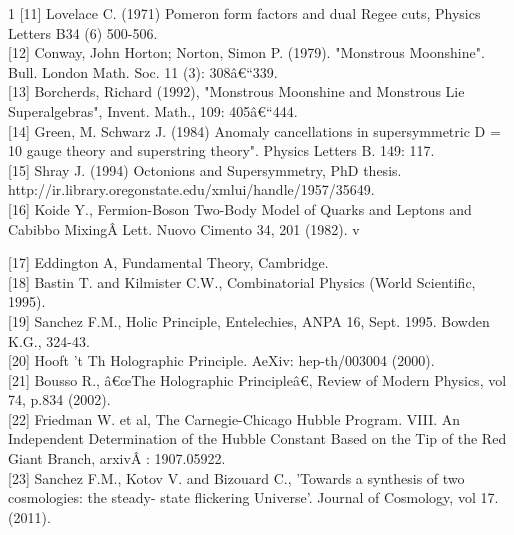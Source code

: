 \documentclass[a4paper,9pt]{article}
\begin{document}
\begin{thebibliography}{1}
 [11]  Lovelace C. (1971) Pomeron form factors and dual Regee cuts, Physics Letters B34 (6) 500-506.\\

[12]  Conway, John Horton; Norton, Simon P. (1979). "Monstrous Moonshine". Bull. London Math. Soc. 11 (3): 308â€“339.\\

[13]  Borcherds, Richard (1992), "Monstrous Moonshine and Monstrous Lie Superalgebras", Invent. Math., 109: 405â€“444.\\ 

[14]  Green, M. Schwarz J. (1984)  Anomaly cancellations in supersymmetric D = 10 gauge theory and superstring theory". Physics Letters B. 149: 117.\\



 [15] Shray J. (1994) Octonions and Supersymmetry, PhD thesis.  http://ir.library.oregonstate.edu/xmlui/handle/1957/35649. \\

[16]  Koide Y., Fermion-Boson Two-Body Model of Quarks and Leptons and Cabibbo MixingÂ  Lett. Nuovo Cimento 34, 201 (1982). v 

[17]  Eddington A, Fundamental Theory, Cambridge.\\

[18] Bastin T. and Kilmister C.W., Combinatorial Physics (World Scientific, 1995).\\

[19]   Sanchez F.M., Holic Principle, Entelechies, ANPA 16, Sept. 1995. Bowden K.G., 324-43.\\

[20]   Hooft 't Th Holographic Principle. AeXiv: hep-th/003004 (2000). \\

[21] Bousso R., â€œThe Holographic Principleâ€, Review of Modern Physics, vol 74, p.834 (2002).\\

[22] Friedman W. et al, The Carnegie-Chicago Hubble Program. VIII. An Independent Determination of the Hubble Constant Based on the Tip of the Red Giant Branch, arxivÂ : 1907.05922.\\ 

[23]  Sanchez F.M., Kotov V. and Bizouard C., 'Towards a synthesis of two cosmologies: the steady- state flickering Universe'. Journal of Cosmology, vol 17. (2011).\\


\end{thebibliography}
\end{document}

